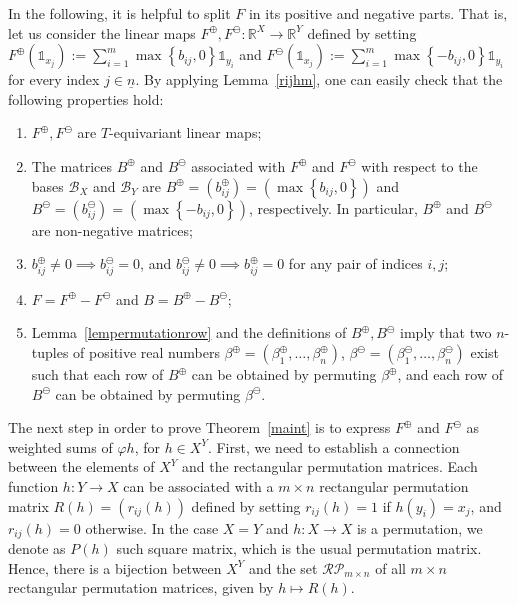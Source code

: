 \documentclass[11pt]{article}
\newcommand{\R}{\mathbb{R}}
\begin{document}
In the following, it is helpful to split $F$ in its positive and negative parts. That is, let us consider the linear maps ${F^\oplus},{F^\ominus}:\R^X\to\R^Y$ defined by setting ${F^\oplus}(\mathds{1}_{x_j}) := \sum_{i=1}^{m}\max \left\{b_{ij},0\right\} \mathds{1}_{y_i}$ and ${F^\ominus}(\mathds{1}_{x_j}) := \sum_{i=1}^{m}\max \left\{-b_{ij},0\right\} \mathds{1}_{y_i}$ for every index $j\in \underline{n}$. 
{\color{black} By applying Lemma~\ref{rijhm},} one can easily check that the following properties hold:

\begin{enumerate}
  \item ${F^\oplus},{F^\ominus}$ are $T$-equivariant linear maps;
  \item The matrices $B^\oplus$ and $B^\ominus$ associated with ${F^\oplus}$ and ${F^\ominus}$ with respect to the bases $\mathcal{B}_X$ and $\mathcal{B}_Y$ are $B^\oplus =\left(b^\oplus_{ij}\right) = \left( \max\left\{b_{ij},0\right\}\right)$ and $B^\ominus = \left(b^\ominus_{ij}\right)=\left(\max\left\{-b_{ij},0\right\}\right)$, respectively. In particular, $B^\oplus$ and $B^\ominus$ are non-negative matrices;
  \item $b_{ij}^\oplus \neq 0 \implies b_{ij}^\ominus = 0$, and $b_{ij}^\ominus \neq 0 \implies b_{ij}^\oplus = 0$ for any pair of indices $i,j$;
  \item $F=F^\oplus - F^\ominus$ and $B={B^\oplus}-{B^\ominus}$;
    \item \label{property5} Lemma~\ref{lempermutationrow} and the definitions of $B^\oplus, B^\ominus$ imply that two $n$-tuples of positive real numbers $\beta^\oplus=\left(\beta^\oplus_1,\dots,\beta^\oplus_{n}\right)$, $\beta^\ominus=\left(\beta^\ominus_1,\dots,\beta^\ominus_{n}\right)$ exist such that each row of ${B^\oplus}$ can be obtained by permuting $\beta^\oplus$, and each row of ${B^\ominus}$ can be obtained by permuting $\beta^\ominus$.
\end{enumerate}

The next step in order to prove Theorem~\ref{maint} is to express $F^\oplus$ and $F^\ominus$ as weighted sums of $\varphi h$, for $h \in X^Y$. First, we need to establish a connection between the elements of $X^Y$ and the rectangular permutation matrices. Each function $h \colon Y \to X$ can be associated with a $m \times n$ rectangular permutation matrix $R(h)=(r_{ij}(h))$ defined by setting $r_{ij}(h)=1$ if $h(y_i)=x_j$, and $r_{ij}(h)=0$ otherwise. In the case $X = Y$ and $h \colon X \to X$ is a permutation, we denote as $P(h)$ such square matrix, which is the usual permutation matrix. 
Hence, there is a bijection between $X^Y$ and the set $\mathcal{RP}_{m \times n}$
of all $m \times n$ rectangular permutation matrices, given by $h \mapsto R(h)$.
\end{document}
